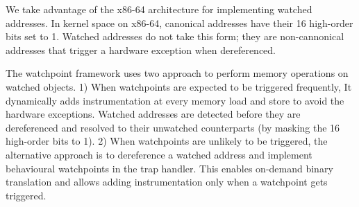 \documentclass[letterpaper,twocolumn,10pt]{article}
\begin{document}

We take advantage of the x86-64 architecture for implementing watched addresses. In kernel space on x86-64, canonical addresses have their 16 high-order bits set to 1. Watched addresses do not take this form; they are non-cannonical addresses that trigger a hardware exception when dereferenced.

The watchpoint framework uses two approach to perform memory operations on watched objects. 1) When watchpoints are expected to be triggered frequently, It dynamically adds instrumentation at every memory load and store to avoid the hardware exceptions. Watched addresses are detected before they are dereferenced and resolved to their unwatched counterparts (by masking the 16 high-order bits to 1). 2) When watchpoints are unlikely to be triggered, the alternative approach is to dereference a watched address and implement behavioural watchpoints in the trap handler. This enables on-demand binary translation and allows adding instrumentation only when a watchpoint gets triggered.%










\end{document}
